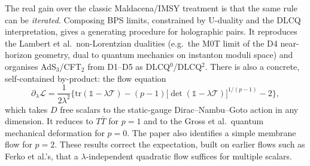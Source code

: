 \documentclass[11pt,a4paper]{article}
\newcommand{\TTbar}{$T\bar{T}$}
\begin{document}
The real gain over the classic Maldacena/IMSY treatment is that the same rule can be
\emph{iterated}. Composing BPS limits, constrained by U-duality and the DLCQ
interpretation, gives a generating procedure for holographic pairs. It reproduces the
Lambert et al.\ non-Lorentzian dualities (e.g.\ the M0T limit of the D4 near-horizon
geometry, dual to quantum mechanics on instanton moduli space) and organises AdS$_3$/CFT$_2$
from D1--D5 as DLCQ$^0$/DLCQ$^2$. There is also a concrete, self-contained by-product:
the flow equation
\[
\partial_\lambda\mathcal{L}=\frac{1}{2\lambda^2}\Big\{\mathrm{tr}(\mathbb{1}-\lambda\mathcal{T})
-(p-1)\big[\det(\mathbb{1}-\lambda\mathcal{T})\big]^{1/(p-1)}-2\Big\},
\]
which takes $D$ free scalars to the static-gauge Dirac--Nambu--Goto action in any dimension.
It reduces to \TTbar{} for $p=1$ and to the Gross et al.\ quantum mechanical deformation for $p=0$.
The paper also identifies a simple membrane flow for $p=2$. These results correct the
expectation, built on earlier flows such as Ferko et al.'s, that a $\lambda$-independent
quadratic flow suffices for multiple scalars.
\end{document}

